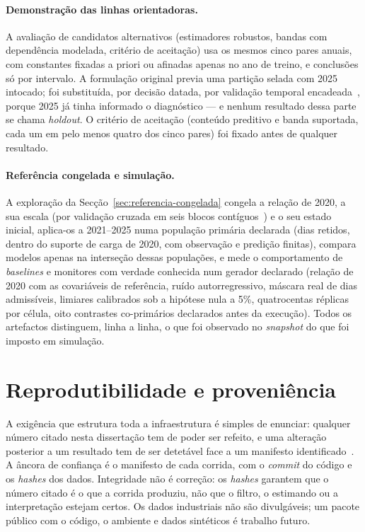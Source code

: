 \paragraph{Demonstração das linhas orientadoras.} A avaliação de
candidatos alternativos (estimadores robustos, bandas com dependência
modelada, critério de aceitação) usa os mesmos cinco pares anuais, com
constantes fixadas a priori ou afinadas apenas no ano de treino, e
conclusões só por intervalo. A formulação original previa uma partição
selada com 2025 intocado; foi substituída, por decisão datada, por
validação temporal encadeada~\cite{Tashman2000,BergmeirHyndmanKoo2018},
porque 2025 já tinha informado o diagnóstico --- e nenhum resultado dessa parte se chama \emph{holdout}. O
critério de aceitação (conteúdo preditivo e banda suportada, cada um em
pelo menos quatro dos cinco pares) foi fixado antes de qualquer resultado.

\paragraph{Referência congelada e simulação.} A exploração da
Secção~\ref{sec:referencia-congelada} congela a relação de 2020, a sua
escala (por validação cruzada em seis blocos contíguos~\cite{BergmeirHyndmanKoo2018})
e o seu estado
inicial, aplica-os a 2021--2025 numa população primária declarada (dias
retidos, dentro do suporte de carga de 2020, com observação e predição
finitas), compara modelos apenas na interseção dessas populações, e mede o
comportamento de \emph{baselines} e monitores com verdade conhecida num
gerador declarado (relação de 2020 com as covariáveis de referência, ruído
autorregressivo, máscara real de dias admissíveis, limiares calibrados sob
a hipótese nula a 5\%, quatrocentas réplicas por célula, oito contrastes
co-primários declarados antes da execução). Todos os artefactos
distinguem, linha a linha, o que foi observado no \emph{snapshot} do que
foi imposto em simulação.

\section{Reprodutibilidade e proveniência}
\label{sec:reprodutibilidade}

A exigência que estrutura toda a infraestrutura é simples de enunciar:
qualquer número citado nesta dissertação tem de poder ser refeito, e uma
alteração posterior a um resultado tem de ser detetável face a um manifesto
identificado~\cite{Peng2011,Sandve2013}. A âncora de confiança é o manifesto
de cada corrida, com o \emph{commit} do código e os \emph{hashes} dos dados.
Integridade não é correção: os \emph{hashes} garantem que o número citado é o
que a corrida produziu, não que o filtro, o estimando ou a interpretação
estejam certos. Os dados industriais não são divulgáveis; um pacote público
com o código, o ambiente e dados sintéticos é trabalho futuro.

